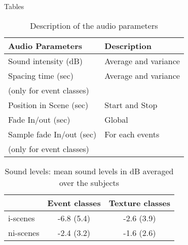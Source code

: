 \documentclass[12pt, titlepage, reqno]{article} %
\begin{document}
\newpage




\newpage
 
 \begin{center}
 
 \large{Tables}
 
 
 \end{center}
 
\begin{table}[h]
\caption{\label{Audio parameters} Description of the audio parameters}
\begin{tabular}{l l} 
Audio Parameters & Description \\
\hline
Sound intensity (dB) & Average and variance \\
Spacing time (sec) & Average and variance \\
(only for event classes)&  \\ 
Position in Scene (sec) & Start and Stop\\
Fade In/out (sec)  & Global \\
Sample fade In/out (sec)  & For each events \\
(only for event classes)&  \\ 
\hline
\end{tabular}
\end{table}

\newpage
\begin{table}[h]
\caption{\label{SNR} Sound levels: mean sound levels in dB averaged over the subjects}
\begin{tabular}{l c c } 
              & Event classes & Texture classes\\
    \hline
	i-scenes & -6.8 (5.4) & -2.6 (3.9) \\
    ni-scenes& -2.4 (3.2) & -1.6 (2.6) \\
    \hline
\end{tabular}
\end{table}
\end{document}
